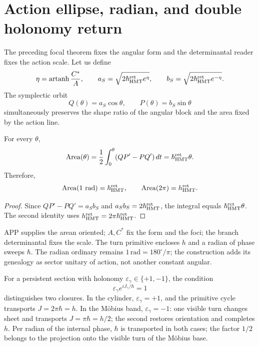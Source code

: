 \section{Action ellipse, radian, and double holonomy return}
\label{sec:elipse-accion-holonomia-rev8}

The preceding focal theorem fixes the angular form and the determinantal reader
fixes the action scale. Let us define
\[
 \eta=\operatorname{artanh}\frac{C^*}{A},
 \qquad
 a_S=\sqrt{2\hbar_{\rm HMT}^{\rm ret}e^\eta},
 \qquad
 b_S=\sqrt{2\hbar_{\rm HMT}^{\rm ret}e^{-\eta}}.
\]
The symplectic orbit
\[
 Q(\theta)=a_S\cos\theta,
 \qquad
 P(\theta)=b_S\sin\theta
\]
simultaneously preserves the shape ratio of the angular block and the area
fixed by the action line.

\begin{theorem}
\label{thm:area-fase-elipse-rev8}
For every \(\theta\),
\[
 \operatorname{Area}(\theta)
 =\frac12\int_0^\theta(QP'-PQ')\,dt
 =\hbar_{\rm HMT}^{\rm ret}\theta.
\]
Therefore,
\[
 \operatorname{Area}(1\ {\rm rad})=\hbar_{\rm HMT}^{\rm ret},
 \qquad
 \operatorname{Area}(2\pi)=h_{\rm HMT}^{\rm ret}.
\]
\end{theorem}

\begin{proof}
Since \(QP'-PQ'=a_Sb_S\) and
\(a_Sb_S=2\hbar_{\rm HMT}^{\rm ret}\), the integral equals
\(\hbar_{\rm HMT}^{\rm ret}\theta\). The second identity uses
\(h_{\rm HMT}^{\rm ret}=2\pi\hbar_{\rm HMT}^{\rm ret}\).
\end{proof}

APP supplies the arean oriented; \(A,C^*\) fix the form and the foci; the branch
determinantal fixes the scale. The turn primitive encloses \(h\) and a radian
of phase sweeps \(\hbar\). The radian ordinary remains
\(1\,\mathrm{rad}=180^\circ/\pi\); the construction adds its genealogy as
sector unitary of action, not another constant angular.

For a persistent section with holonomy
\(\varepsilon_\gamma\in\{+1,-1\}\), the condition
\[
 \varepsilon_\gamma e^{iJ_\gamma/\hbar}=1
\]
distinguishes two closures. In the cylinder, \(\varepsilon_\gamma=+1\), and the primitive
cycle transports \(J=2\pi\hbar=h\). In the Möbius band,
\(\varepsilon_\gamma=-1\): one visible turn changes sheet and transports
\(J=\pi\hbar=h/2\); the second restores orientation and completes \(h\). Per
radian of the internal phase, \(\hbar\) is transported in both cases; the factor
\(1/2\) belongs to the projection onto the visible turn of the Möbius base.


